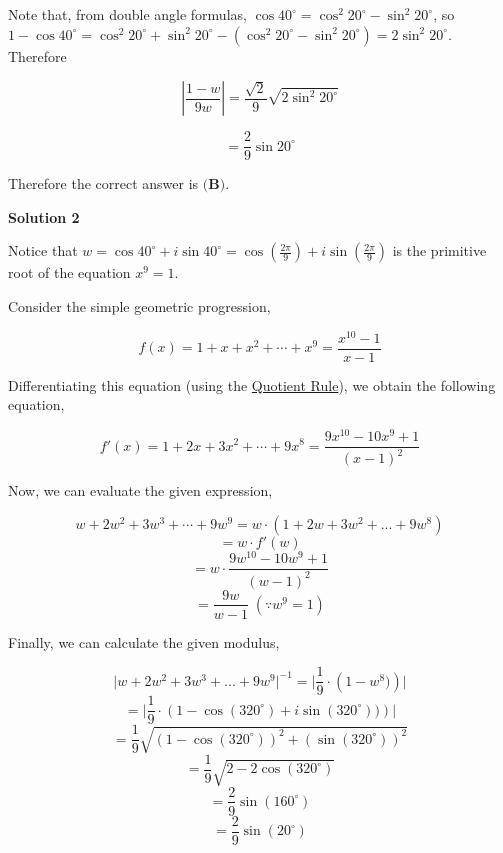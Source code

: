 \begin{enumerate}
 Note that, from double angle formulas, $\cos{40^{\circ}}=\cos^2{20^{\circ}}-\sin^2{20^{\circ}}$, so $1-\cos{40^{\circ}}=\cos^2{20^{\circ}}+\sin^2{20^{\circ}}-(\cos^2{20^{\circ}}-\sin^2{20^{\circ}})=2\sin^2{20^{\circ}}$. Therefore

 
 \[\left|\frac{1-w}{9w}\right|=\frac{\sqrt{2}}{9} \sqrt{2\sin^2{20^{\circ}}}\]

 \[=\frac{2}{9}\sin{20^{\circ}}\]

 Therefore the correct answer is $\boxed{\textbf{(B)}}$.

 



\textbf{Solution 2}

Notice that $w = \cos40^\circ+i\sin40^\circ = \cos\left(\frac{2\pi}{9}\right)+i\sin\left(\frac{2\pi}{9}\right)$ is the primitive root of the equation $x^9 = 1$.

 Consider the simple geometric progression,

 
 \[f(x) = 1 + x + x^2 +\cdots + x^9 = \frac{x^{10} - 1}{x - 1}\]

 Differentiating this equation (using the \href{https://artofproblemsolving.com/wiki/index.php/Quotient\_Rule}{Quotient Rule}), we obtain the following equation,

 
 \[f'(x) = 1 + 2x + 3x^2 + \cdots + 9x^8 = \frac{9x^{10} - 10x^9 + 1}{(x - 1)^2}\]

 Now, we can evaluate the given expression,

 
 \[w + 2w^2 + 3w^3 + \cdots + 9w^9 = w \cdot (1+2w+3w^2+...+9w^8)\]
 \[= w\cdot f'(w)\]
 \[= w\cdot\frac{9w^{10} - 10w^9 + 1}{(w - 1)^2}\]
 \[= \frac{9w}{w-1} \; (\because w^9 = 1)\]

 Finally, we can calculate the given modulus,

 
 \[\lvert w+2w^2+3w^3+...+9w^9 \rvert^{-1} = \lvert \frac{1}{9}\cdot\left(1 - w^8) \right) \rvert\]
 \[= \lvert \frac{1}{9}\cdot\left(1 - \cos\left(320^\circ\right)+i\sin\left(320^\circ\right)) \right) \rvert\]
 \[= \frac{1}{9}\sqrt{\left(1 - \cos\left(320^\circ\right)\right)^2+\left(\sin\left(320^\circ\right)\right)^2}\]
 \[= \frac{1}{9}\sqrt{2 - 2\cos\left(320^\circ\right)}\]
 \[= \frac{2}{9}\sin\left(160^\circ\right)\]
 \[= \boxed{\frac{2}{9}\sin\left(20^\circ\right)}\]



\end{enumerate}
